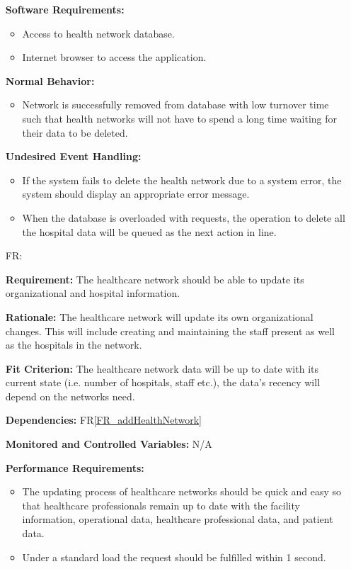 \documentclass[12pt]{article}
\newcounter{reqnum} %
\begin{document}
\begin{itemize}
\textbf{Software Requirements:}
\begin{itemize}
  \item Access to health network database.
  \item Internet browser to access the application.
\end{itemize}

\textbf{Normal Behavior:}
\begin{itemize}
  \item Network is successfully removed from database with low turnover time such that health networks will not have to spend a long time waiting for their data to be deleted.
\end{itemize}

\textbf{Undesired Event Handling:}
\begin{itemize}
  \item If the system fails to delete the health network due to a system error, the system should display an appropriate error message. 
  \item When the database is overloaded with requests, the operation to delete all the hospital data will be queued as the next action in line.
\end{itemize}


\item[FR\refstepcounter{reqnum}\thereqnum \label{FR_UpdateHealthNetwork}:]

\textbf{Requirement:} The healthcare network should be able to update its organizational and hospital information.

\textbf{Rationale:} The healthcare network will update its own organizational changes. This will include creating and maintaining the staff present as well as the hospitals in the network.

\textbf{Fit Criterion:} The healthcare network data will be up to date with its current state (i.e. number of hospitals, staff etc.), the data's recency will depend on the networks need. 

\textbf{Dependencies:} FR\ref{FR_addHealthNetwork}

\textbf{Monitored and Controlled Variables:} N/A

\textbf{Performance Requirements:} 
\begin{itemize}
  \item The updating process of healthcare networks should be quick and easy so that healthcare professionals remain up to date with the facility information, operational data, healthcare professional data, and patient data.
  \item Under a standard load the request should be fulfilled within 1 second.
\end{itemize}


\end{itemize}
\end{document}
